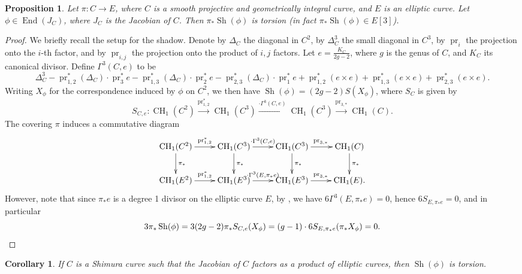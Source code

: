 \documentclass[12pt]{amsart}
\DeclareMathOperator{\CH}{CH}
\DeclareMathOperator{\End}{End}
\DeclareMathOperator{\Sh}{Sh}
\DeclareMathOperator{\pr}{pr}
\numberwithin{equation}{subsection}
\theoremstyle{plain}\newtheorem{ithm}{Theorem}
\theoremstyle{plain}\newtheorem{iprop}[ithm]{Proposition}
\newtheorem{corollary}[equation]{Corollary}
\newtheorem{proposition}[equation]{Proposition}
\theoremstyle{definition}
\theoremstyle{remark}
\begin{document}
\begin{proposition}
\label{prop:pushforwardceresa}
    Let $\pi : C \to E$, where $C$ is a smooth projective and geometrically integral curve, and $E$ is an elliptic curve. Let $\phi \in \End(J_C)$, where $J_C$ is the Jacobian of $C$. Then $\pi_* \Sh(\phi)$ is torsion (in fact $\pi_* \Sh(\phi) \in E[3]$).
\end{proposition}

\begin{proof}
    We briefly recall the setup for the shadow. Denote by $\Delta_C$ the diagonal in $C^2$, by $\Delta_C^3$ the small diagonal in $C^3$, by $\pr_i$ the projection onto the $i$-th factor, and by $\pr_{i,j}$ the projection onto the product of $i,j$ factors. Let $e = \frac{K_C}{2g-2}$, where $g$ is the genus of $C$, and $K_C$ its canonical divisor. Define
    $\Gamma^3(C,e)$ to be 
    $$
    \Delta_C^3 - \pr_{1,2}^*(\Delta_C) \cdot \pr_3^* e
    - \pr_{1,3}^*(\Delta_C) \cdot \pr_2^* e - \pr_{2,3}^*(\Delta_C) \cdot \pr_1^* e + \pr_{1,2}^*(e \times e) + \pr_{1,3}^*(e \times e) + \pr_{2,3}^*(e \times e).
    $$
    Writing $X_{\phi}$ for the correspondence induced by $\phi$ on $C^2$, we then have $\Sh(\phi) = (2g-2) S(X_{\phi})$, where $S_C$ is given by
    $$
    S_{C,e} : \CH_1(C^2) \xrightarrow{\pr_{1,2}^*} \CH_1(C^3)
    \xrightarrow{\cdot \Gamma^3(C,e)} \CH_1(C^3)
    \xrightarrow{\pr_{3,*}} \CH_1(C).
    $$
    The covering $\pi$ induces a commutative diagram
    $$
    \xymatrix{
    \CH_1(C^2) \ar[r]^{\pr_{1,2}^*} \ar[d]^{\pi_*} & \CH_1(C^3) \ar[r]^{\cdot \Gamma^3(C,e)} \ar[d]^{\pi_*} 
    & \CH_1(C^3) \ar[r]^{\pr_{3,*}} \ar[d]^{\pi_*}  & \CH_1(C) \ar[d]^{\pi_*}  \\
    \CH_1(E^2) \ar[r]^{\pr_{1,2}^*} & \CH_1(E^3) \ar[r]^{\cdot \Gamma^3(E,\pi_* e)} & \CH_1(E^3) \ar[r]^{\pr_{3,*}}
    & \CH_1(E).
    }
    $$
    However, note that since $\pi_*e$ is a degree 1 divisor on the elliptic curve $E$, by \cite[Corollary 4.7]{GS95}, we have $6\Gamma^3(E, \pi_* e) = 0$, hence $6S_{E,\pi_{*} e} = 0$, and in particular 
    \begin{equation*}
    3 \pi_* \Sh(\phi) = 3 (2g-2) \pi_* S_{C,e}(X_{\phi})
    = (g-1) \cdot 6S_{E, \pi_* e} (\pi_* X_{\phi}) = 0. \qedhere
    \end{equation*}
\end{proof}


\begin{corollary}
If $C$ is a Shimura curve such that the Jacobian of $C$ factors as a product of elliptic curves, then $\Sh(\phi)$ is torsion.
\end{corollary}
\end{document}

